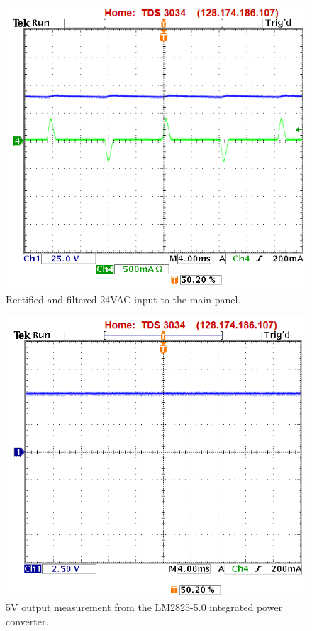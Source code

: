 \begin{figure}
\centering
\includegraphics[width=.99\textwidth]{main_rectified_input.png}
\caption{Rectified and filtered 24VAC input to the main panel.}
\label{fig:main_rectified}
\end{figure}
\begin{figure}
\centering
\includegraphics[width=.8\textwidth]{main_5v_output.png}
\caption{5V output measurement from the LM2825-5.0 integrated power converter.}
\label{fig:main_5v_output}
\end{figure}
